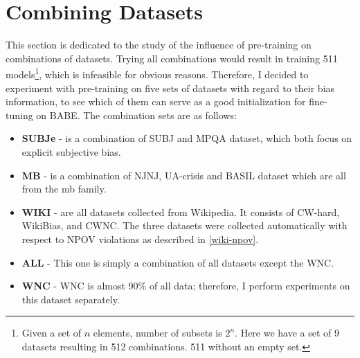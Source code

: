\section{Combining Datasets}
This section is dedicated to the study of the influence of pre-training on combinations of datasets. Trying all combinations would result in training 511 models\footnote{Given a set of $n$ elements, number of subsets is $2^n$. Here we have a set of 9 datasets resulting in 512 combinations. 511 without an empty set.}, which is infeasible for obvious reasons. Therefore, I decided to experiment with pre-training on five sets of datasets with regard to their bias information, to see which of them can serve as a good initialization for fine-tuning on BABE.
The combination sets are as follows:
\begin{itemize}
    \item \textbf{SUBJe} - is a combination of SUBJ and MPQA dataset, which both focus on explicit subjective bias.
    \item \textbf{MB} - is a combination of NJNJ, UA-crisis and BASIL dataset which are all from the \gls{mb} family.
    \item \textbf{WIKI} - are all datasets collected from Wikipedia. It consists of CW-hard, WikiBias, and CWNC. The three datasets were collected automatically with respect to NPOV violations as described in \ref{wiki-npov}.
    \item \textbf{ALL} - This one is simply a combination of all datasets except the WNC.
    \item \textbf{WNC} - WNC is almost 90\% of all data; therefore, I perform experiments on this dataset separately.
\end{itemize}
 
